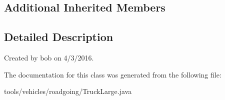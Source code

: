 \subsection*{Additional Inherited Members}


\subsection{Detailed Description}
Created by bob on 4/3/2016. 

The documentation for this class was generated from the following file\+:\begin{DoxyCompactItemize}
\item 
tools/vehicles/roadgoing/Truck\+Large.\+java\end{DoxyCompactItemize}
